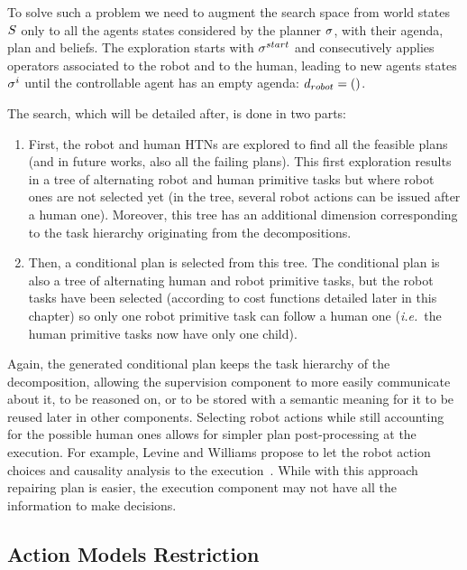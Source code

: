 \documentclass[a4paper,11pt,twoside]{StyleThese}
\begin{document}
To solve such a problem we need to augment the search space from world states $S$ only to all the agents states considered by the planner $\sigma$, with their agenda, plan and beliefs. The exploration starts with $\sigma^{start}$ and consecutively applies operators associated to the robot and to the human, leading to new agents states $\sigma^{i}$ until the controllable agent has an empty agenda: $d_{robot} = ()$.

The search, which will be detailed after, is done in two parts:
\begin{enumerate}
\item First, the robot and human HTNs are explored to find all the feasible plans (and in future works, also all the failing plans). This first exploration results in a tree of alternating robot and human primitive tasks but where robot ones are not selected yet (in the tree, several robot actions can be issued after a human one). Moreover, this tree has an additional dimension corresponding to the task hierarchy originating from the  decompositions.

\item  Then, a conditional plan is selected from this tree. The conditional plan is also a tree of alternating human and robot primitive tasks, but the robot tasks have been selected (according to cost functions detailed later in this chapter) so only one robot primitive task can follow a human one (\textit{i.e.}~the human primitive tasks now have only one child).
\end{enumerate}

Again, the generated conditional plan keeps the task hierarchy of the  decomposition, allowing the supervision component to more easily communicate about it, to be reasoned on, or to be stored with a semantic meaning for it to be reused later in other components. Selecting robot actions while still accounting for the possible human ones allows for simpler plan post-processing at the execution. For example, Levine and Williams propose to let the robot action choices and causality analysis to the execution~\cite{levine2014concurrent}. While with this approach repairing plan is easier, the execution component may not have all the information to make decisions.

\subsection{Action Models Restriction}
\end{document}
